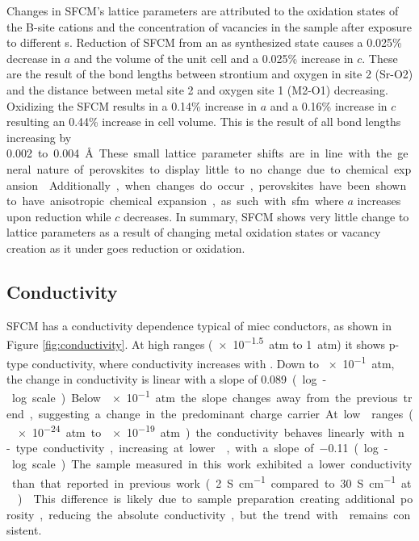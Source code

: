     Changes in SFCM's lattice parameters are attributed to the oxidation states of the B-site cations and the concentration of vacancies in the sample after exposure to different s.
    Reduction of SFCM from an as synthesized state causes a 0.025\% decrease in $a$ and the volume of the unit cell and a 0.025\% increase in $c$.
    These are the result of the bond lengths between strontium and oxygen in site 2 (Sr-O2) and the distance between metal site 2 and oxygen site 1 (M2-O1) decreasing. %
    Oxidizing the SFCM results in a 0.14\% increase in $a$ and a 0.16\% increase in $c$ resulting an 0.44\% increase in cell volume.
    This is the result of all bond lengths increasing by \SI{0.002} to \SI{0.004}{\angstrom}.
    These small lattice parameter shifts are in line with the general nature of perovskites to display little to no change due to chemical expansion.\cite{Bishop2014}
    Additionally, when changes do occur, perovskites have been shown to have anisotropic chemical expansion, as such with \gls{sfm} where $a$ increases upon reduction while $c$ decreases.\cite{Tsvetkov2016}
    In summary, SFCM shows very little change to lattice parameters as a result of changing metal oxidation states or vacancy creation as it under goes reduction or oxidation.

    \subsection{Conductivity}
    SFCM has a conductivity dependence typical of \gls{miec} conductors, as shown in Figure \ref{fig:conductivity}.
    At high  ranges (\SI{e-1.5}{atm} to \SI{1}{atm}) it shows p-type conductivity, where conductivity increases with .
    Down to \SI{e-1}{atm}, the change in conductivity is linear with a slope of \SI{0.089} (log-log scale).
    Below \SI{e-1}{atm} the slope changes away from the previous trend, suggesting a change in the predominant charge carrier.
    At low  ranges (\SI{e-24}{atm} to \SI{e-19}{atm}) the conductivity behaves linearly with n-type conductivity, increasing at lower , with a slope of \SI{-0.11} (log-log scale).
    The sample measured in this work exhibited a lower conductivity than that reported in previous work (\SI{2}{S\per\centi\meter} compared to \SI{30}{S\per\centi\meter} at ).\cite{Pan}
    This difference is likely due to sample preparation creating additional porosity, reducing the absolute conductivity, but the trend with  remains consistent.

